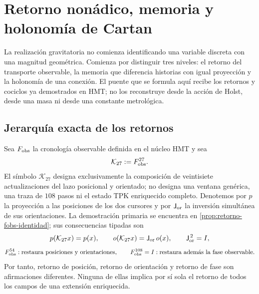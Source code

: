 \chapter{Retorno nonádico, memoria y holonomía de Cartan}
\label{chap:puente-retorno-holonomia-cartan}

La realización gravitatoria no comienza identificando una variable discreta
con una magnitud geométrica. Comienza por distinguir tres niveles: el retorno
del transporte observable, la memoria que diferencia historias con igual
proyección y la holonomía de una conexión. El puente que se formula aquí
recibe los retornos y cociclos ya demostrados en HMT; no los reconstruye
desde la acción de Holst, desde una masa ni desde una constante metrológica.

\section{Jerarquía exacta de los retornos}
\label{sec:jerarquia-retornos-27-54-108}

Sea \(F_{\rm obs}\) la cronología observable definida en el núcleo HMT y sea
\[
 \mathcal K_{27}:=F_{\rm obs}^{27}.
\]
El símbolo \(\mathcal K_{27}\) designa exclusivamente la composición de
veintisiete actualizaciones del lazo posicional y orientado; no designa una
ventana genérica, una traza de \(108\) pasos ni el estado TPK enriquecido
completo. Denotemos por \(p\) la proyección a las posiciones de los dos
cursores y por \(\mathsf J_{\rm or}\) la inversión simultánea de sus
orientaciones. La demostración primaria se encuentra en
\cref{prop:retorno-fobs-identidad}; sus consecuencias tipadas son
\[
 p(\mathcal K_{27}x)=p(x),\qquad
 o(\mathcal K_{27}x)=\mathsf J_{\rm or}\,o(x),
 \qquad \mathsf J_{\rm or}^{\,2}=I,
\]
\[
 F_{\rm obs}^{54}:
 \text{restaura posiciones y orientaciones},
 \qquad
 F_{\rm obs}^{108}=I:
 \text{restaura además la fase observable}.
\]
Por tanto, retorno de posición, retorno de orientación y retorno de fase son
afirmaciones diferentes. Ninguna de ellas implica por sí sola el retorno de
todos los campos de una extensión enriquecida.

